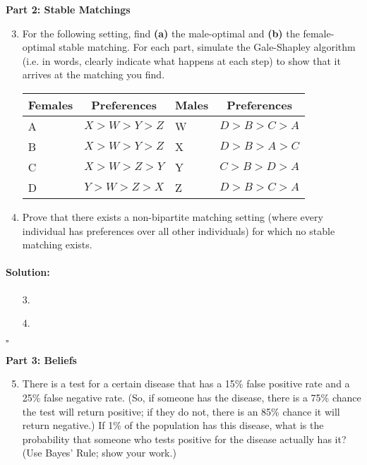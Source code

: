 \documentclass[11pt,letterpaper]{article}
\newif \iftemplate \templatetrue
\newenvironment{solution}{\paragraph{Solution:}}{\hfill$\square$}
\theoremstyle{definition}
\begin{document}
\noindent
{\Large\textbf{Part 2: Stable Matchings}\par}

\begin{enumerate}
\setcounter{enumi}{2}
\item For the following setting, find \textbf{(a)} the male-optimal and \textbf{(b)} the female-optimal stable matching. For each part, simulate the Gale-Shapley algorithm (i.e. in words, clearly indicate what happens at each step) to show that it arrives at the matching you find.

\begin{center}
\medskip
\begin{tabular}{|l|c||l|c|}
\hline
Females & Preferences & Males & Preferences\\
\hline
A & $X > W > Y > Z$ & W & $D > B > C > A$\\
\hline
B & $X > W > Y > Z$ & X & $D > B > A > C$\\
\hline
C & $X > W > Z > Y$ & Y & $C > B > D > A$\\
\hline
D & $Y > W > Z > X$ & Z & $D > B > C > A$\\
\hline
\end{tabular}
\end{center}

\item Prove that there exists a non-bipartite matching setting (where every individual has preferences over all other individuals) for which no stable matching exists.
\end{enumerate}

\iftemplate
\begin{solution}
\begin{enumerate}
\item[3.]
\item[4.]
\end{enumerate}
\end{solution}
\newpage
\fi


\noindent
{\Large\textbf{Part 3: Beliefs}\par}

\begin{enumerate}
\setcounter{enumi}{4}
\item There is a test for a certain disease that has a 15\% false positive rate and a 25\% false negative rate. (So, if someone has the disease, there is a 75\% chance the test will return positive; if they do not, there is an 85\% chance it will return negative.) If 1\% of the population has this disease, what is the probability that someone who tests positive for the disease actually has it? (Use Bayes' Rule; show your work.)
\end{enumerate}
\end{document}
